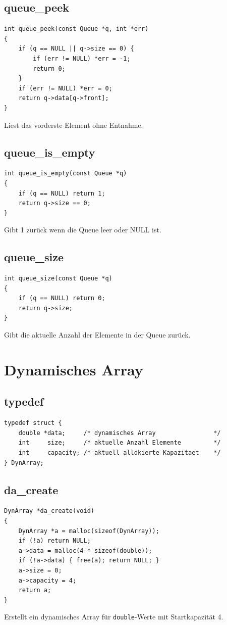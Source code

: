 \documentclass[10pt, a4paper]{article}
\begin{document}
\subsection{queue\_peek}
\begin{lstlisting}
int queue_peek(const Queue *q, int *err)
{
    if (q == NULL || q->size == 0) {
        if (err != NULL) *err = -1;
        return 0;
    }
    if (err != NULL) *err = 0;
    return q->data[q->front];
}
\end{lstlisting}
Liest das vorderste Element ohne Entnahme.

\subsection{queue\_is\_empty}
\begin{lstlisting}
int queue_is_empty(const Queue *q)
{
    if (q == NULL) return 1;
    return q->size == 0;
}
\end{lstlisting}
Gibt 1 zur\"uck wenn die Queue leer oder NULL ist.

\subsection{queue\_size}
\begin{lstlisting}
int queue_size(const Queue *q)
{
    if (q == NULL) return 0;
    return q->size;
}
\end{lstlisting}
Gibt die aktuelle Anzahl der Elemente in der Queue zur\"uck.

\newpage
\section{Dynamisches Array}

\subsection{typedef}
\begin{lstlisting}
typedef struct {
    double *data;     /* dynamisches Array                */
    int     size;     /* aktuelle Anzahl Elemente         */
    int     capacity; /* aktuell allokierte Kapazitaet    */
} DynArray;
\end{lstlisting}

\subsection{da\_create}
\begin{lstlisting}
DynArray *da_create(void)
{
    DynArray *a = malloc(sizeof(DynArray));
    if (!a) return NULL;
    a->data = malloc(4 * sizeof(double));
    if (!a->data) { free(a); return NULL; }
    a->size = 0;
    a->capacity = 4;
    return a;
}
\end{lstlisting}
Erstellt ein dynamisches Array f\"ur \texttt{double}-Werte mit Startkapazit\"at 4.
\end{document}
